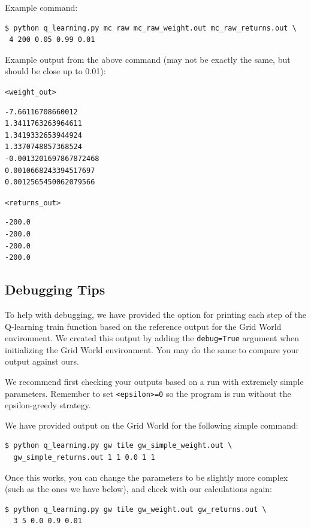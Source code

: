 \documentclass[11pt,addpoints,answers]{exam}
\begin{document}
Example command:
\begin{lstlisting}[language=Shell]
$ python q_learning.py mc raw mc_raw_weight.out mc_raw_returns.out \ 
 4 200 0.05 0.99 0.01
\end{lstlisting}

Example output from the above command (may not be exactly the same, but should be close up to 0.01):

\texttt{<weight\_out>}
\begin{lstlisting}
-7.66116708660012
1.3411763263964611
1.3419332653944924
1.3370748857368524
-0.0013201697867872468
0.0010668243394517697
0.0012565450062079566
\end{lstlisting}

\texttt{<returns\_out>}
\begin{lstlisting}
-200.0
-200.0
-200.0
-200.0
\end{lstlisting}


\subsection{Debugging Tips}\label{subsec:debugging}

To help with debugging, we have provided the option for printing each step of the Q-learning train function based on the reference output for the Grid World environment. We created this output by adding the \texttt{debug=True} argument when initializing the Grid World environment. You may do the same to compare your output against ours.

We recommend first checking your outputs based on a run with extremely simple parameters. Remember to set \texttt{<epsilon>=0} so the program is run without the epsilon-greedy strategy.

We have provided output on the Grid World for the following simple command:

\begin{lstlisting}[language=Shell]
$ python q_learning.py gw tile gw_simple_weight.out \
  gw_simple_returns.out 1 1 0.0 1 1
\end{lstlisting}

Once this works, you can change the parameters to be slightly more complex (such as the ones we have below), and check with our calculations again:

\begin{lstlisting}[language=Shell]
$ python q_learning.py gw tile gw_weight.out gw_returns.out \
  3 5 0.0 0.9 0.01
\end{lstlisting}
\end{document}
